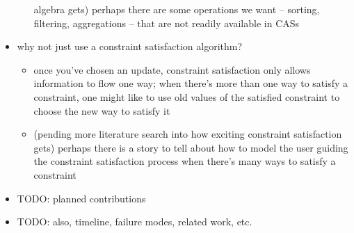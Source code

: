 \documentclass{article}
\begin{document}
\begin{itemize}
\begin{itemize}
                algebra gets) perhaps there are some operations we want --
                sorting, filtering, aggregations -- that are not readily
                available in CASs
        \end{itemize}
    \item why not just use a constraint satisfaction algorithm?
        \begin{itemize}
            \item once you've chosen an update, constraint satisfaction only
                allows information to flow one way; when there's more than
                one way to satisfy a constraint, one might like to use old
                values of the satisfied constraint to choose the new way to
                satisfy it
            \item (pending more literature search into how exciting
                constraint satisfaction gets) perhaps there is a story to
                tell about how to model the user guiding the constraint
                satisfaction process when there's many ways to satisfy a
                constraint
        \end{itemize}
    \item TODO: planned contributions
    \item TODO: also, timeline, failure modes, related work, etc.
\end{itemize}
\end{document}
